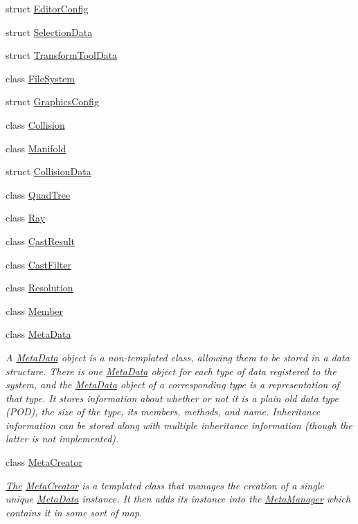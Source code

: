 \begin{DoxyCompactItemize}
\item 
struct \hyperlink{structDCEngine_1_1EditorConfig}{Editor\-Config}
\item 
struct \hyperlink{structDCEngine_1_1SelectionData}{Selection\-Data}
\item 
struct \hyperlink{structDCEngine_1_1TransformToolData}{Transform\-Tool\-Data}
\item 
class \hyperlink{classDCEngine_1_1FileSystem}{File\-System}
\item 
struct \hyperlink{structDCEngine_1_1GraphicsConfig}{Graphics\-Config}
\item 
class \hyperlink{classDCEngine_1_1Collision}{Collision}
\item 
class \hyperlink{classDCEngine_1_1Manifold}{Manifold}
\item 
struct \hyperlink{structDCEngine_1_1CollisionData}{Collision\-Data}
\item 
class \hyperlink{classDCEngine_1_1QuadTree}{Quad\-Tree}
\item 
class \hyperlink{structDCEngine_1_1Ray}{Ray}
\item 
class \hyperlink{structDCEngine_1_1CastResult}{Cast\-Result}
\item 
class \hyperlink{structDCEngine_1_1CastFilter}{Cast\-Filter}
\item 
class \hyperlink{classDCEngine_1_1Resolution}{Resolution}
\item 
class \hyperlink{classDCEngine_1_1Member}{Member}
\item 
class \hyperlink{classDCEngine_1_1MetaData}{Meta\-Data}
\begin{DoxyCompactList}\small\item\em A \hyperlink{classDCEngine_1_1MetaData}{Meta\-Data} object is a non-\/templated class, allowing them to be stored in a data structure. There is one \hyperlink{classDCEngine_1_1MetaData}{Meta\-Data} object for each type of data registered to the system, and the \hyperlink{classDCEngine_1_1MetaData}{Meta\-Data} object of a corresponding type is a representation of that type. It stores information about whether or not it is a plain old data type (P\-O\-D), the size of the type, its members, methods, and name. Inheritance information can be stored along with multiple inheritance information (though the latter is not implemented). \end{DoxyCompactList}\item 
class \hyperlink{classDCEngine_1_1MetaCreator}{Meta\-Creator}
\begin{DoxyCompactList}\small\item\em \hyperlink{classThe}{The} \hyperlink{classDCEngine_1_1MetaCreator}{Meta\-Creator} is a templated class that manages the creation of a single unique \hyperlink{classDCEngine_1_1MetaData}{Meta\-Data} instance. It then adds its instance into the \hyperlink{classDCEngine_1_1MetaManager}{Meta\-Manager} which contains it in some sort of map. \end{DoxyCompactList}\item 

\end{DoxyCompactItemize}
